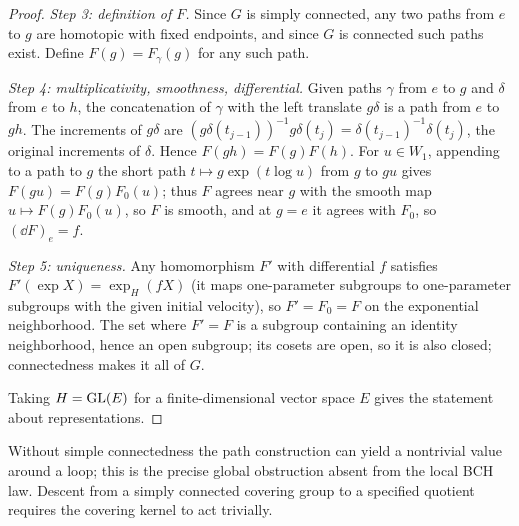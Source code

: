 \begin{proof}
\emph{Step 3: definition of $F$.} Since $G$ is simply connected, any two
paths from $e$ to $g$ are homotopic with fixed endpoints, and since $G$ is
connected such paths exist. Define $F(g)=F_\gamma(g)$ for any such path.

\emph{Step 4: multiplicativity, smoothness, differential.} Given paths
$\gamma$ from $e$ to $g$ and $\delta$ from $e$ to $h$, the concatenation of
$\gamma$ with the left translate $g\delta$ is a path from $e$ to $gh$. The
increments of $g\delta$ are $(g\delta(t_{j-1}))^{-1}g\delta(t_j)
=\delta(t_{j-1})^{-1}\delta(t_j)$, the original increments of $\delta$.
Hence $F(gh)=F(g)F(h)$. For $u\in W_1$, appending to a path to $g$ the
short path $t\mapsto g\exp(t\log u)$ from $g$ to $gu$ gives
$F(gu)=F(g)F_0(u)$; thus $F$ agrees near $g$ with the smooth map
$u\mapsto F(g)F_0(u)$, so $F$ is smooth, and at $g=e$ it agrees with $F_0$,
so $(\dd F)_e=f$.

\emph{Step 5: uniqueness.} Any homomorphism $F'$ with differential $f$
satisfies $F'(\exp X)=\exp_H(fX)$ (it maps one-parameter subgroups to
one-parameter subgroups with the given initial velocity), so $F'=F_0=F$ on
the exponential neighborhood. The set where $F'=F$ is a subgroup
containing an identity neighborhood, hence an open subgroup; its cosets
are open, so it is also closed; connectedness makes it all of $G$.

Taking $H=\operatorname{GL}(E)$ for a finite-dimensional vector space $E$ gives the
statement about representations.
\end{proof}
Without simple connectedness the path construction can yield a
nontrivial value around a loop; this is the precise global obstruction
absent from the local BCH law. Descent from a simply connected covering
group to a specified quotient requires the covering kernel to act trivially.

